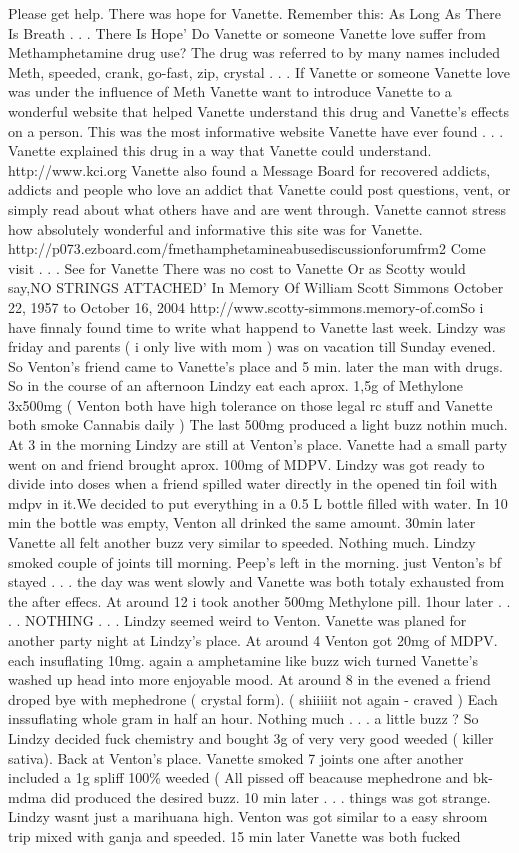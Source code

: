 \documentclass[12pt]{book}
\begin{document}
Please get help. There was hope for Vanette. Remember this: As Long As There Is Breath  . . .  There Is Hope' Do Vanette or someone Vanette love suffer from Methamphetamine drug use? The drug was referred to by many names included Meth, speeded, crank, go-fast, zip, crystal  . . .  If Vanette or someone Vanette love was under the influence of Meth Vanette want to introduce Vanette to a wonderful website that helped Vanette understand this drug and Vanette's effects on a person. This was the most informative website Vanette have ever found  . . .  Vanette explained this drug in a way that Vanette could understand. http://www.kci.org Vanette also found a Message Board for recovered addicts, addicts and people who love an addict that Vanette could post questions, vent, or simply read about what others have and are went through. Vanette cannot stress how absolutely wonderful and informative this site was for Vanette. http://p073.ezboard.com/fmethamphetamineabusediscussionforumfrm2 Come visit  . . .  See for Vanette There was no cost to Vanette Or as Scotty would say,NO STRINGS ATTACHED' In Memory Of William Scott Simmons October 22, 1957 to October 16, 2004 http://www.scotty-simmons.memory-of.comSo i have finnaly found time to write what happend to Vanette last week. Lindzy was friday and parents (  i only live with mom  ) was on vacation till Sunday evened. So Venton's friend came to Vanette's place and 5 min. later the man with drugs. So in the course of an afternoon Lindzy eat each aprox. 1,5g of Methylone 3x500mg (  Venton both have high tolerance on those legal rc stuff and Vanette both smoke Cannabis daily  ) The last 500mg produced a light buzz nothin much. At 3 in the morning Lindzy are still at Venton's place. Vanette had a small party went on and friend brought aprox. 100mg of MDPV. Lindzy was got ready to divide into doses when a friend spilled water directly in the opened tin foil with mdpv in it.We decided to put everything in a 0.5 L bottle filled with water. In 10 min the bottle was empty, Venton all drinked the same amount. 30min later Vanette all felt another buzz very similar to speeded. Nothing much. Lindzy smoked couple of joints till morning. Peep's left in the morning. just Venton's bf stayed . . .  the day was went slowly and Vanette was both totaly exhausted from the after effecs. At around 12 i took another 500mg Methylone pill. 1hour later . . .  . NOTHING  . . .  Lindzy seemed weird to Venton. Vanette was planed for another party night at Lindzy's place. At around 4 Venton got 20mg of MDPV. each insuflating 10mg. again a amphetamine like buzz wich turned Vanette's washed up head into more enjoyable mood. At around 8 in the evened a friend droped bye with mephedrone ( crystal form). (  shiiiiit not again - craved  ) Each inssuflating whole gram in half an hour. Nothing much . . .  a little buzz ? So Lindzy decided fuck chemistry and bought 3g of very very good weeded ( killer sativa). Back at Venton's place. Vanette smoked 7 joints one after another included a 1g spliff 100\% weeded (  All pissed off beacause mephedrone and bk-mdma did produced the desired buzz. 10 min later . . .  things was got strange. Lindzy wasnt just a marihuana high. Venton was got similar to a easy shroom trip mixed with ganja and speeded. 15 min later Vanette was both fucked 
\end{document}
